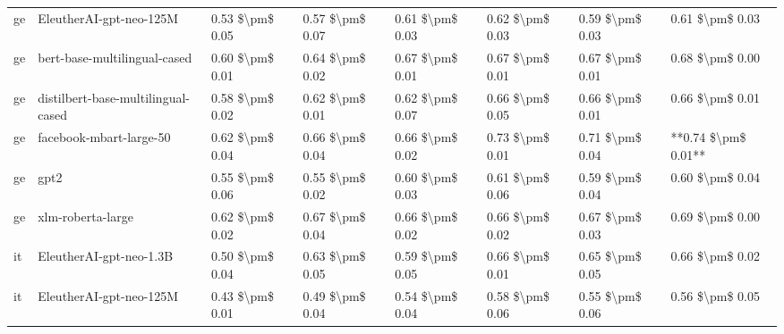 \begin{tabular}{llllllll}
      ge &            EleutherAI-gpt-neo-125M & 0.53 \$\textbackslash pm\$ 0.05 &           0.57 \$\textbackslash pm\$ 0.07 &       0.61 \$\textbackslash pm\$ 0.03 &        0.62 \$\textbackslash pm\$ 0.03 &                         0.59 \$\textbackslash pm\$ 0.03 &     0.61 \$\textbackslash pm\$ 0.03 \\
      ge &       bert-base-multilingual-cased & 0.60 \$\textbackslash pm\$ 0.01 &           0.64 \$\textbackslash pm\$ 0.02 &       0.67 \$\textbackslash pm\$ 0.01 &        0.67 \$\textbackslash pm\$ 0.01 &                         0.67 \$\textbackslash pm\$ 0.01 &     0.68 \$\textbackslash pm\$ 0.00 \\
      ge & distilbert-base-multilingual-cased & 0.58 \$\textbackslash pm\$ 0.02 &           0.62 \$\textbackslash pm\$ 0.01 &       0.62 \$\textbackslash pm\$ 0.07 &        0.66 \$\textbackslash pm\$ 0.05 &                         0.66 \$\textbackslash pm\$ 0.01 &     0.66 \$\textbackslash pm\$ 0.01 \\
      ge &            facebook-mbart-large-50 & 0.62 \$\textbackslash pm\$ 0.04 &           0.66 \$\textbackslash pm\$ 0.04 &       0.66 \$\textbackslash pm\$ 0.02 &        0.73 \$\textbackslash pm\$ 0.01 &                         0.71 \$\textbackslash pm\$ 0.04 & **0.74 \$\textbackslash pm\$ 0.01** \\
      ge &                               gpt2 & 0.55 \$\textbackslash pm\$ 0.06 &           0.55 \$\textbackslash pm\$ 0.02 &       0.60 \$\textbackslash pm\$ 0.03 &        0.61 \$\textbackslash pm\$ 0.06 &                         0.59 \$\textbackslash pm\$ 0.04 &     0.60 \$\textbackslash pm\$ 0.04 \\
      ge &                  xlm-roberta-large & 0.62 \$\textbackslash pm\$ 0.02 &           0.67 \$\textbackslash pm\$ 0.04 &       0.66 \$\textbackslash pm\$ 0.02 &        0.66 \$\textbackslash pm\$ 0.02 &                         0.67 \$\textbackslash pm\$ 0.03 &     0.69 \$\textbackslash pm\$ 0.00 \\
      it &            EleutherAI-gpt-neo-1.3B & 0.50 \$\textbackslash pm\$ 0.04 &           0.63 \$\textbackslash pm\$ 0.05 &       0.59 \$\textbackslash pm\$ 0.05 &        0.66 \$\textbackslash pm\$ 0.01 &                         0.65 \$\textbackslash pm\$ 0.05 &     0.66 \$\textbackslash pm\$ 0.02 \\
      it &            EleutherAI-gpt-neo-125M & 0.43 \$\textbackslash pm\$ 0.01 &           0.49 \$\textbackslash pm\$ 0.04 &       0.54 \$\textbackslash pm\$ 0.04 &        0.58 \$\textbackslash pm\$ 0.06 &                         0.55 \$\textbackslash pm\$ 0.06 &     0.56 \$\textbackslash pm\$ 0.05 \\

\end{tabular}
